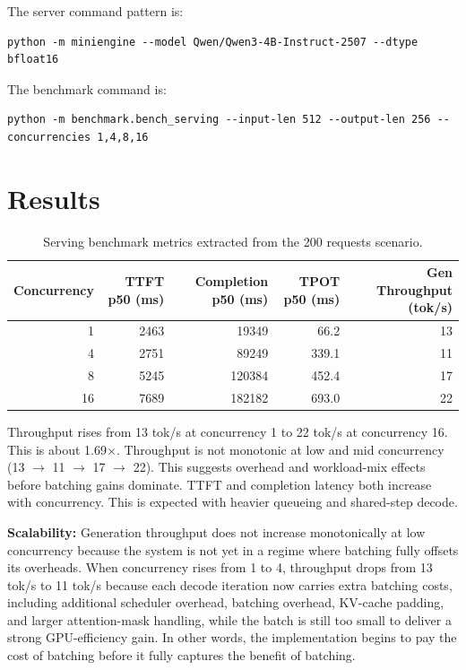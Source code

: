 \documentclass[11pt]{article}
\begin{document}
The server command pattern is:

\begin{verbatim}
python -m miniengine --model Qwen/Qwen3-4B-Instruct-2507 --dtype bfloat16
\end{verbatim}

The benchmark command is:

\begin{verbatim}
python -m benchmark.bench_serving --input-len 512 --output-len 256 --concurrencies 1,4,8,16
\end{verbatim}

\section{Results}

\begin{table}[h]
\centering
\small
\begin{tabular}{rrrrr}
\toprule
Concurrency & TTFT p50 (ms) & Completion p50 (ms) & TPOT p50 (ms) & Gen Throughput (tok/s) \\
\midrule
1  & 2463 & 19349  & 66.2  & 13 \\
4  & 2751 & 89249  & 339.1 & 11 \\
8  & 5245 & 120384 & 452.4 & 17 \\
16 & 7689 & 182182 & 693.0 & 22 \\
\bottomrule
\end{tabular}
\caption{Serving benchmark metrics extracted from the 200 requests scenario.}
\end{table}
Throughput rises from 13 tok/s at concurrency 1 to 22 tok/s at concurrency 16. This is about 1.69\(\times\). Throughput is not monotonic at low and mid concurrency (13 \(\rightarrow\) 11 \(\rightarrow\) 17 \(\rightarrow\) 22). This suggests overhead and workload-mix effects before batching gains dominate. TTFT and completion latency both increase with concurrency. This is expected with heavier queueing and shared-step decode.

\textbf{Scalability: }
Generation throughput does not increase monotonically at low concurrency because the system is not yet in a regime where batching fully offsets its overheads. 
When concurrency rises from 1 to 4, throughput drops from 13 tok/s to 11 tok/s because each decode iteration now carries extra batching costs, including additional scheduler overhead, batching overhead, KV-cache padding, and larger attention-mask handling, while the batch is still too small to deliver a strong GPU-efficiency gain. 
In other words, the implementation begins to pay the cost of batching before it fully captures the benefit of batching. 
\end{document}
